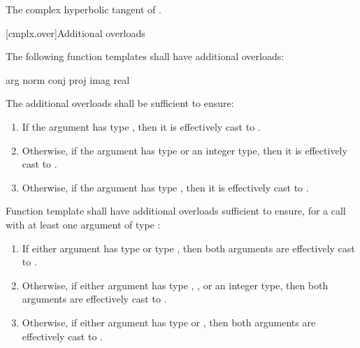 \begin{itemdescr}
\pnum
\returns
The complex hyperbolic tangent of .
\end{itemdescr}

[cmplx.over]{Additional overloads}

\pnum
{}%
%
%
%
%
The following function templates shall have additional overloads:
\begin{codeblock}
arg                   norm 
conj                  proj
imag                  real 
\end{codeblock}

\pnum
{}%
The additional overloads shall be sufficient to ensure:

\begin{enumerate}
        \item If the argument has type , then it is effectively 
              cast to .
        \item Otherwise, if the argument has type  or an integer type,
              then it is effectively cast to .
        \item Otherwise, if the argument has type , then it is 
              effectively cast to .
\end{enumerate}

\pnum
{}%
Function template  shall have additional overloads sufficient to
ensure, for a call with at least one argument of type :

\begin{enumerate}

  \item If either argument has type  or type , then both arguments are effectively cast to
        .
  \item Otherwise, if either argument has type , ,
        or an integer type, then both arguments are effectively cast to
        .
  \item Otherwise, if either argument has type  or ,
        then both arguments are effectively cast to .
\end{enumerate}

